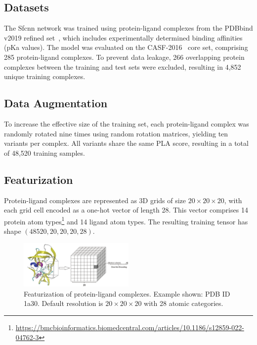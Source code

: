\documentclass[unnumsec,webpdf,contemporary,large]{oup-authoring-template}
\theoremstyle{thmstyleone}%
\theoremstyle{thmstyletwo}%
\theoremstyle{thmstylethree}%
\begin{document}
\subsection{Datasets}
\vspace{0.5em}
The Sfcnn network was trained using protein-ligand complexes from the PDBbind v2019 refined set~\cite{Wang2005PDBbind}, which includes experimentally determined binding affinities (pKa values). The model was evaluated on the CASF-2016~\cite{su2018comparative} core set, comprising 285 protein-ligand complexes. To prevent data leakage, 266 overlapping protein complexes between the training and test sets were excluded, resulting in 4,852 unique training complexes.

\subsection{Data Augmentation}
\vspace{0.5em}
To increase the effective size of the training set, each protein-ligand complex was randomly rotated nine times using random rotation matrices, yielding ten variants per complex. All variants share the same PLA score, resulting in a total of 48,520 training samples.

\subsection{Featurization}
\vspace{0.5em}
Protein-ligand complexes are represented as 3D grids of size $20 \times 20 \times 20$, with each grid cell encoded as a one-hot vector of length 28. This vector comprises 14 protein atom types\footnote{\url{https://bmcbioinformatics.biomedcentral.com/articles/10.1186/s12859-022-04762-3}} and 14 ligand atom types. The resulting training tensor has shape $(48520, 20, 20, 20, 28)$.

\begin{figure}[H]
    \centering
    \includegraphics[width=0.5\textwidth]{images/one_hot.png}
    \caption{Featurization of protein-ligand complexes. Example shown: PDB ID 1a30. Default resolution is $20\times20\times20$ with 28 atomic categories.}
    \label{fig:onehot}
\end{figure}
\end{document}
